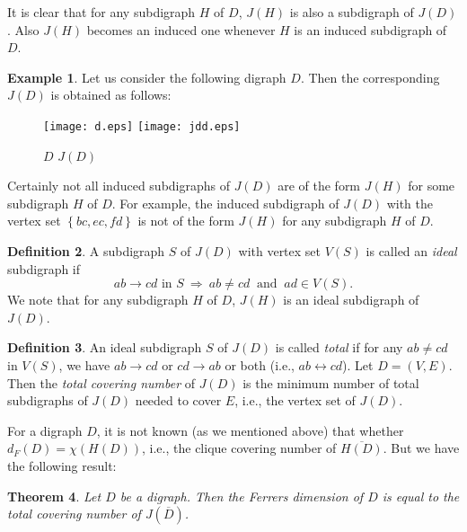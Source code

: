 \documentclass[11pt]{article}
\newtheorem{thm}{Theorem}[section]
\theoremstyle{definition}
\newtheorem{defn}[thm]{Definition}
\newtheorem{exmp}[thm]{Example}
\theoremstyle{remark}
\numberwithin{equation}{section}
\newcommand{\set}[1]{\left\{#1\right\}}
\begin{document}
It is clear that for any subdigraph $H$ of $D$, $J(H)$ is also a subdigraph of $J(D)$. Also $J(H)$ becomes an induced one whenever $H$ is an induced subdigraph of $D$.

\begin{exmp}Let us consider the following digraph $D$. Then the corresponding $J(D)$ is obtained as follows:
\begin{figure}[h]
\begin{center}
\texttt{[image: d.eps]}\hspace{1in}
\texttt{[image: jdd.eps]}

$D$ \hspace{3in} $J(D)$
\end{center}
\end{figure}
\end{exmp}

\vspace{-2em} Certainly not all induced subdigraphs of $J(D)$ are of the form $J(H)$ for some subdigraph $H$ of $D$. For example, the induced subdigraph of $J(D)$ with the vertex set $\set{bc, ec, fd}$ is not of the form $J(H)$ for any subdigraph $H$ of $D$.

\begin{defn} A subdigraph $S$ of $J(D)$ with vertex set $V(S)$ is called an {\em ideal} subdigraph if
$$ab \longrightarrow cd \textrm{ in } S\ \Longrightarrow\ ab \neq cd\ \textrm{ and }\ ad \in V(S).$$
We note that for any subdigraph $H$ of $D$, $J(H)$ is an ideal subdigraph of $J(D)$.
\end{defn}

\begin{defn} An ideal subdigraph $S$ of $J(D)$ is called {\em total} if for any $ab\neq cd$ in $V(S)$, we have $ab\longrightarrow cd$ or $cd \longrightarrow ab$ or both (i.e., $ab\longleftrightarrow cd$). Let $D=(V,E)$. Then the {\em total covering number} of $J(D)$ is the minimum number of total subdigraphs of $J(D)$ needed to cover $E$, i.e., the vertex set of $J(D)$.
\end{defn}

For a digraph $D$, it is not known (as we mentioned above) that whether $d_F(D)=\chi(H(D))$, i.e., the clique covering number of $\overline{H(D)}$. But we have the following result:
\begin{thm} \label{thm:beta2}
Let $D$ be a digraph. Then the Ferrers dimension of $D$ is equal to the total covering number of $J(\overline D)$.
\end{thm}
\end{document}
